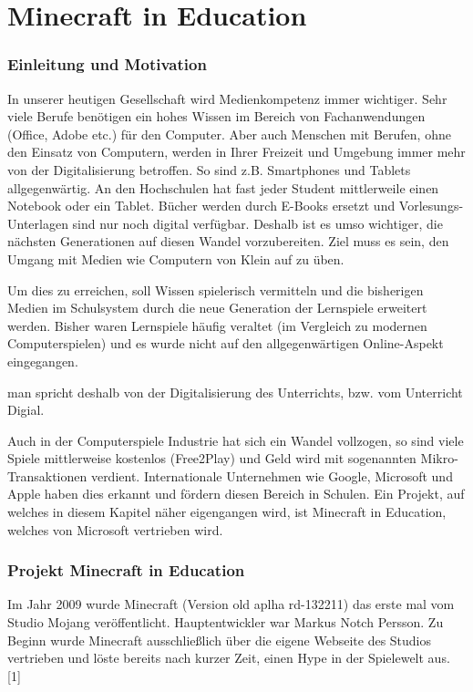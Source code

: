 \chapter{Minecraft in Education}
\subsection{Einleitung und Motivation}
In unserer heutigen Gesellschaft wird Medienkompetenz immer wichtiger. Sehr viele Berufe benötigen ein hohes Wissen im Bereich von Fachanwendungen (Office, Adobe etc.) für den Computer. 
Aber auch Menschen mit Berufen, ohne den Einsatz von Computern, werden in Ihrer Freizeit und Umgebung immer mehr von der Digitalisierung betroffen.
So sind z.B. Smartphones und Tablets allgegenwärtig. An den Hochschulen hat fast jeder Student mittlerweile einen Notebook oder ein Tablet.
Bücher werden durch E-Books ersetzt und Vorlesungs-Unterlagen sind nur noch digital verfügbar. Deshalb ist es umso wichtiger, die nächsten Generationen auf diesen Wandel vorzubereiten. 
Ziel muss es sein, den Umgang mit Medien wie Computern von Klein auf zu üben.

Um dies zu erreichen, soll Wissen spielerisch vermitteln und die bisherigen Medien im Schulsystem durch die neue Generation der Lernspiele erweitert werden.
Bisher waren Lernspiele häufig veraltet (im Vergleich zu modernen Computerspielen) und es wurde nicht auf den allgegenwärtigen Online-Aspekt eingegangen.

man spricht deshalb von der Digitalisierung des Unterrichts, bzw. vom Unterricht Digial.

Auch in der Computerspiele Industrie hat sich ein Wandel vollzogen, so sind viele Spiele mittlerweise kostenlos (Free2Play)
und Geld wird mit sogenannten Mikro-Transaktionen verdient. 
Internationale Unternehmen wie Google, Microsoft und Apple haben dies erkannt und fördern diesen Bereich in Schulen.
Ein Projekt, auf welches in diesem Kapitel näher eigengangen wird, ist Minecraft in Education, welches von Microsoft vertrieben wird.

\subsection{Projekt Minecraft in Education}

Im Jahr 2009 wurde Minecraft (Version old aplha rd-132211) das erste mal vom
Studio Mojang veröffentlicht. Hauptentwickler war Markus Notch Persson. Zu Beginn wurde Minecraft
ausschließlich über die eigene Webseite des Studios vertrieben und löste bereits nach kurzer Zeit,
einen Hype in der Spielewelt aus. 
[1]

